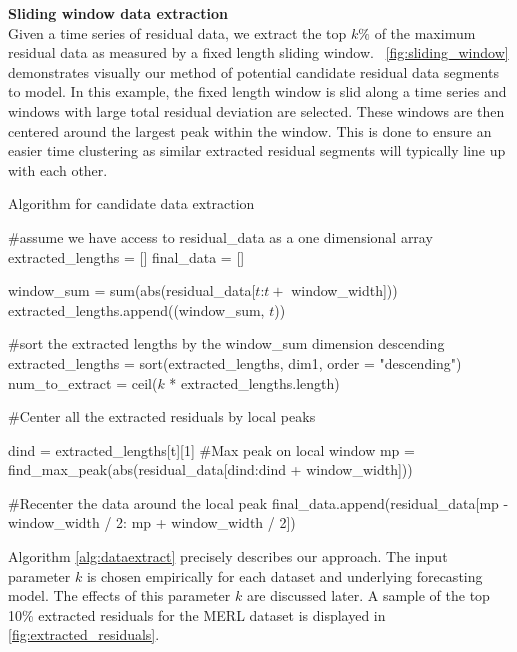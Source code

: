 \bigskip
\noindent \textbf{Sliding window data extraction} \\
Given a time series of residual data, we extract the top $k\%$ of the maximum residual data as measured by a fixed length sliding window.  ~\ref{fig:sliding_window} demonstrates visually our method of potential candidate residual data segments to model.  In this example, the fixed length window is slid along a time series and windows with large total residual deviation are selected.  These windows are then centered around the largest peak within the window.  This is done to ensure an easier time clustering as similar extracted residual segments will typically line up with each other.

\begin{algorithm}
	\caption{Algorithm for candidate data extraction}
   	\label{alg:dataextract}
	
	\begin{algorithmic}
		\State \#assume we have access to residual\_data as a one dimensional array
		\State 
		\State extracted\_lengths = []
		\State final\_data = []
   		\State 
				
		\State	window\_sum = sum(abs(residual\_data[$t$:$t +$ window\_width]))
		\State 	extracted\_lengths.append((window\_sum, $t$))
		\EndFor
		
		\State
		\State \#sort the extracted lengths by the window\_sum dimension descending
		\State extracted\_lengths = sort(extracted\_lengths, dim1, order = "descending")
		\State num\_to\_extract = ceil($k$ * extracted\_lengths.length)
		
		\State
		\State \#Center all the extracted residuals by local peaks
		
		\State 	dind = extracted\_lengths[t][1]
		\State	\#Max peak on local window
		\State	mp = find\_max\_peak(abs(residual\_data[dind:dind + window\_width]))
		
		\State
		\State 	\#Recenter the data around the local peak
		\State	final\_data.append(residual\_data[mp - window\_width / 2: mp + window\_width / 2])

		\EndFor

	\end{algorithmic}
\end{algorithm}


Algorithm \ref{alg:dataextract} precisely describes our approach.  The input parameter $k$ is chosen empirically for each dataset and underlying forecasting model.  The effects of this parameter $k$ are discussed later.  A sample of the top 10\% extracted residuals for the MERL dataset is displayed in \ref{fig:extracted_residuals}.

